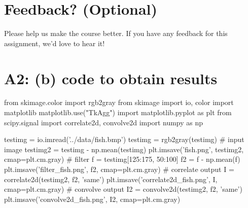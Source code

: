 \pagebreak
\section*{Feedback? (Optional)}
Please help us make the course better. If you have any feedback for this assignment, we'd love to hear it!


\pagebreak
\section*{A2: (b) code to obtain results}
\begin{python}
from skimage.color import rgb2gray
from skimage import io, color
import matplotlib
matplotlib.use("TkAgg")
import matplotlib.pyplot as plt
from scipy.signal import correlate2d, convolve2d
import numpy as np

testimg = io.imread('../data/fish.bmp')
testimg = rgb2gray(testimg)
# input image
testimg2 = testimg - np.mean(testimg)
plt.imsave('fish.png', testimg2, cmap=plt.cm.gray)
# filter 
f = testimg[125:175, 50:100]
f2 = f - np.mean(f)
plt.imsave('filter_fish.png', f2, cmap=plt.cm.gray)
# correlate output
I = correlate2d(testimg2, f2, 'same')
plt.imsave('correlate2d_fish.png', I, cmap=plt.cm.gray)
# convolve output
I2 = convolve2d(testimg2, f2, 'same')
plt.imsave('convolve2d_fish.png', I2, cmap=plt.cm.gray)
\end{python}

\newpage
